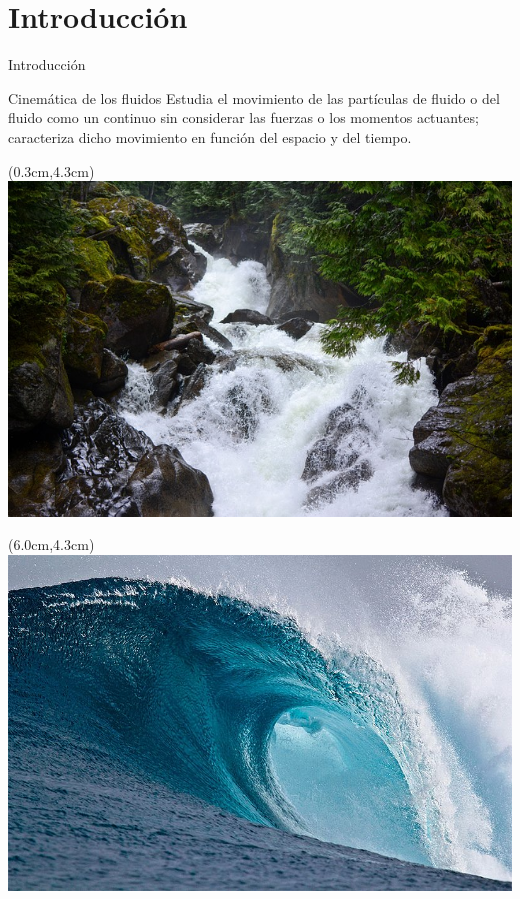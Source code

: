 \documentclass [xcolor=svgnames, t] {beamer}
\begin{document}
\section{Introducci\'on}
\begin{frame}{Introducci\'on}
\begin{block}{Cinem\'atica de los fluidos}
Estudia el movimiento de las part\'iculas de fluido o del fluido como un continuo sin considerar las fuerzas o los momentos actuantes; caracteriza dicho movimiento en funci\'on del espacio y del tiempo.
\begin{textblock*}{5.5cm}(0.3cm,4.3cm) %
\includegraphics[width=\textwidth]{kine}
\end{textblock*}
\begin{textblock*}{5.5cm}(6.0cm,4.3cm) %
\includegraphics[width=\textwidth]{kine1}
\end{textblock*}
\end{block}
\end{frame} 
\end{document}
